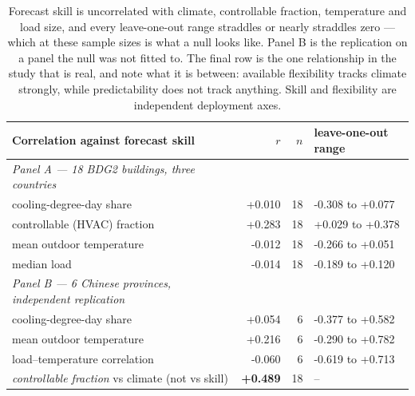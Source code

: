\begin{table}[t]
\centering
\small
\begin{tabular}{lrrl}
\toprule
Correlation against forecast skill & $r$ & $n$ & leave-one-out range \\
\midrule
\emph{Panel A --- 18 BDG2 buildings, three countries} &  &  &  \\
\quad cooling-degree-day share & +0.010 & 18 & -0.308 to +0.077 \\
\quad controllable (HVAC) fraction & +0.283 & 18 & +0.029 to +0.378 \\
\quad mean outdoor temperature & -0.012 & 18 & -0.266 to +0.051 \\
\quad median load & -0.014 & 18 & -0.189 to +0.120 \\
\midrule
\emph{Panel B --- 6 Chinese provinces, independent replication} &  &  &  \\
\quad cooling-degree-day share & +0.054 & 6 & -0.377 to +0.582 \\
\quad mean outdoor temperature & +0.216 & 6 & -0.290 to +0.782 \\
\quad load--temperature correlation & -0.060 & 6 & -0.619 to +0.713 \\
\midrule
\emph{controllable fraction} vs climate (not vs skill) & \textbf{+0.489} & 18 & -- \\
\bottomrule
\end{tabular}
\caption{Forecast skill is uncorrelated with climate, controllable fraction, temperature and load size, and every leave-one-out range straddles or nearly straddles zero --- which at these sample sizes is what a null looks like. Panel B is the replication on a panel the null was not fitted to. The final row is the one relationship in the study that is real, and note what it is between: available flexibility tracks climate strongly, while predictability does not track anything. Skill and flexibility are independent deployment axes.}
\label{tab:correlations}
\end{table}
